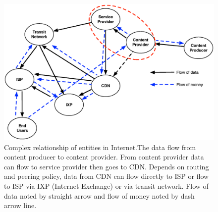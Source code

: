 \documentclass[paper]{ieice}
\begin{document}


\begin{figure}[tb]
\begin{center}
\includegraphics[scale=0.35]{graphs/business-relationship.eps}
\end{center}
\caption{Complex relationship of entities in Internet.The data flow from content producer to content provider. From content provider data can flow to service provider then goes to CDN. Depends on routing and peering policy, data from CDN can flow directly to ISP or flow to ISP via IXP (Internet Exchange) or via transit network. Flow of data noted by straight arrow and flow of money noted by dash arrow line.}
\label{fig:businessrelationship}
\vspace{-2mm}
\end{figure} 


\end{document}
